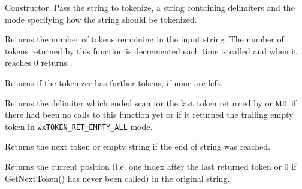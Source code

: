 
Constructor. Pass the string to tokenize, a string containing delimiters
and the mode specifying how the string should be tokenized.


\label{wxstringtokenizercounttokens}


Returns the number of tokens remaining in the input string. The number of
tokens returned by this function is decremented each time 
 is called and when it
reaches $0$  returns
\false.


\label{wxstringtokenizerhasmoretokens}


Returns \true if the tokenizer has further tokens, \false if none are left.


\label{wxstringtokenizergetlastdelimiter}


Returns the delimiter which ended scan for the last token returned by 
 or \texttt{NUL} if
there had been no calls to this function yet or if it returned the trailing
empty token in \texttt{wxTOKEN\_RET\_EMPTY\_ALL} mode.


\label{wxstringtokenizergetnexttoken}


Returns the next token or empty string if the end of string was reached.


\label{wxstringtokenizergetposition}


Returns the current position (i.e. one index after the last returned
token or 0 if GetNextToken() has never been called) in the original
string.


\label{wxstringtokenizergetstring}

